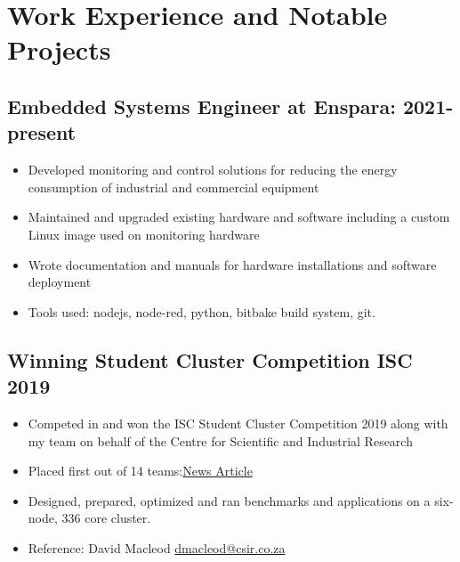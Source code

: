 \documentclass[12pt,a4paper,notitlepage]{article}
\begin{document}
\section*{Work Experience and Notable Projects}

\subsection*{Embedded Systems Engineer at Enspara: 2021-present}
\begin{itemize}
	\setlength\itemsep{0.02em}
    \item Developed monitoring and control solutions for reducing the energy consumption of industrial and commercial equipment
    \item Maintained and upgraded existing hardware and software including a custom Linux image used on monitoring hardware
    \item Wrote documentation and manuals for hardware installations and software deployment
    \item Tools used: nodejs, node-red, python, bitbake build system, git.
\end{itemize}

\subsection*{Winning Student Cluster Competition ISC 2019}
\begin{itemize}
	\setlength\itemsep{0.02em}
    \item Competed in and won the ISC Student Cluster Competition 2019 along with my team on behalf of the Centre for Scientific and Industrial Research
    \item Placed first out of 14 teams:\href{https://www.chpc.ac.za/index.php/news2/241-south-africa-wins-international-student-cluster-competition-for-the-fourth-time}{News Article}
    \item Designed, prepared, optimized and ran benchmarks and applications on a six-node, 336 core cluster.
    \item Reference: David Macleod \href{mailto:dmacleod@csir.co.za}{dmacleod@csir.co.za}
\end{itemize}
\end{document}
